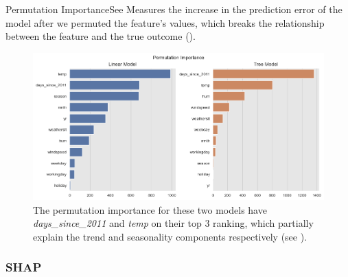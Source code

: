 \documentclass[10pt]{beamer}
\begin{document}
\begin{frame}{Permutation Importance}{See \cite[Section 5.1]{molnar2019}}
Measures the increase in the prediction error of the model after we permuted the feature's values, which breaks the relationship between the feature and the true outcome (\cite[Section 8.5]{molnar2019}).
\begin{center}
  \begin{figure}
    \includegraphics[scale=0.35]{images/interpretable_ml_112_0.png}
    \caption{The permutation importance for these two models have {\em days\_since\_2011} and {\em temp} on their top 3 ranking, which partially explain the trend and seasonality components respectively (see \cite[Figure 8.27]{molnar2019}).}
  \end{figure}
\end{center}
\end{frame}

\subsubsection{SHAP}
\end{document}
